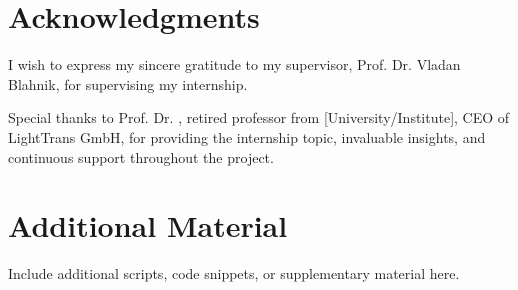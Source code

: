 \documentclass[a4paper,12pt]{report}
\begin{document}
\chapter{Acknowledgments}
I wish to express my sincere gratitude to my supervisor, Prof. Dr. Vladan Blahnik, for supervising my internship. 

Special thanks to Prof. Dr. , retired professor from [University/Institute], CEO of LightTrans GmbH, for providing the internship topic, invaluable insights, and continuous support throughout the project. 






\appendix
\chapter{Additional Material}
Include additional scripts, code snippets, or supplementary material here.
\end{document}
